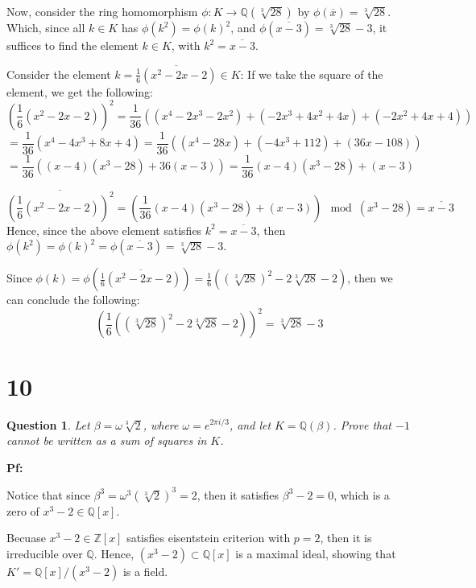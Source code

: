 \documentclass{article}
\newtheorem{question}{Question}
\begin{document}
\hfil

Now, consider the ring homomorphism $\phi:K\rightarrow\mathbb{Q}(\sqrt[3]{28})$ by $\phi(\overline{x})=\sqrt[3]{28}$. Which, since all $k\in K$ has $\phi(k^2)=\phi(k)^2$,
and $\phi(\overline{x-3})=\sqrt[3]{28}-3$, it suffices to find the element $k\in K$, with $k^2=\overline{x-3}$.

\hfil

Consider the element $k=\overline{\frac{1}{6}(x^2-2x-2)}\in K$: If we take the square of the element, we get the following:
$$\left(\frac{1}{6}(x^2-2x-2)\right)^2=\frac{1}{36}((x^4-2x^3-2x^2)+(-2x^3+4x^2+4x)+(-2x^2+4x+4))$$
$$=\frac{1}{36}(x^4-4x^3+8x+4)=\frac{1}{36}((x^4-28x)+(-4x^3+112)+(36x-108))$$
$$=\frac{1}{36}((x-4)(x^3-28)+36(x-3)) = \frac{1}{36}(x-4)(x^3-28)+(x-3)$$

$$\overline{\left(\frac{1}{6}(x^2-2x-2)\right)^2}=\left(\frac{1}{36}(x-4)(x^3-28)+(x-3)\right)\mod (x^3-28) = \overline{x-3}$$
Hence, since the above element satisfies $k^2=\overline{x-3}$, then $\phi(k^2)=\phi(k)^2=\phi(\overline{x-3})=\sqrt[3]{28}-3$.

Since $\phi(k)=\phi(\overline{\frac{1}{6}(x^2-2x-2)})=\frac{1}{6}((\sqrt[3]{28})^2-2\sqrt[3]{28}-2)$, then we can conclude the following:
$$\left(\frac{1}{6}((\sqrt[3]{28})^2-2\sqrt[3]{28}-2)\right)^2=\sqrt[3]{28}-3$$



\break

\section*{10}
\begin{myBox}[]{}
    \begin{question}
        Let $\beta=\omega \sqrt[3]{2}$, where $\omega=e^{2\pi i/3}$, and let $K=\mathbb{Q}(\beta)$. 
        Prove that $-1$ cannot be written as a sum of squares in $K$.
    \end{question}
\end{myBox}

\textbf{Pf:}

Notice that since $\beta^3=\omega^3(\sqrt[3]{2})^3 = 2$, then it satisfies $\beta^3-2=0$, which is a zero of $x^3-2\in\mathbb{Q}[x]$.

Becuase $x^3-2\in \mathbb{Z}[x]$ satisfies eisentstein criterion with $p=2$, then it is irreducible over $\mathbb{Q}$. Hence, $(x^3-2)\subset\mathbb{Q}[x]$
is a maximal ideal, showing that $K'=\mathbb{Q}[x]/(x^3-2)$ is a field.

\hfil
\end{document}
